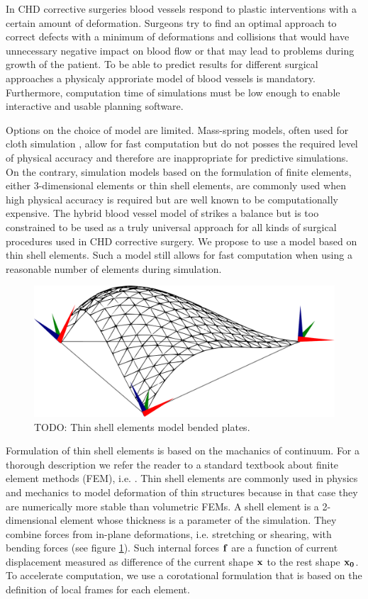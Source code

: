 In CHD corrective surgeries blood vessels respond to plastic interventions with a certain amount of deformation. Surgeons try to find an optimal approach to correct defects with a minimum of deformations and collisions that would have unnecessary negative impact on blood flow or that may lead to problems during growth of the patient. To be able to predict results for different surgical approaches a physicaly approriate model of blood vessels is mandatory. Furthermore, computation time of simulations must be low enough to enable interactive and usable planning software.

Options on the choice of model are limited. Mass-spring models, often used for cloth simulation \cite{Volino2005b}, allow for fast computation but do not posses the required level of physical accuracy and therefore are inappropriate for predictive simulations. On the contrary, simulation models based on the formulation of finite elements, either 3-dimensional elements or thin shell elements, are commonly used when high physical accuracy is required but are well known to be computationally expensive. The hybrid blood vessel model of \cite{Li2009} strikes a balance but is too constrained to be used as a truly universal approach for all kinds of surgical procedures used in CHD corrective surgery. We propose to use a model based on thin shell elements. Such a model still allows for fast computation when using a reasonable number of elements during simulation.

\begin{figure}[tbh]
  \centering
  \includegraphics[width=0.4\columnwidth]{img/shell.pdf}
  \caption{TODO: Thin shell elements model bended plates.}
  \label{fig-shell}
\end{figure}

Formulation of thin shell elements is based on the machanics of continuum. For a thorough description we refer the reader to a standard textbook about finite element methods (FEM), i.e. \cite{Reddy1993}. Thin shell elements are commonly used in physics and mechanics to model deformation of thin structures because in that case they are numerically more stable than volumetric FEMs. A shell element is a 2-dimensional element whose thickness is a parameter of the simulation. They combine forces from in-plane deformations, i.e. stretching or shearing, with bending forces (see figure \ref{fig-shell}). Such internal forces $\mathbf{f}$ are a function of current displacement measured as difference of the current shape $\mathbf{x}$ to the rest shape $\mathbf{x_0}$. To accelerate computation, we use a corotational formulation that is based on the definition of local frames for each element.

